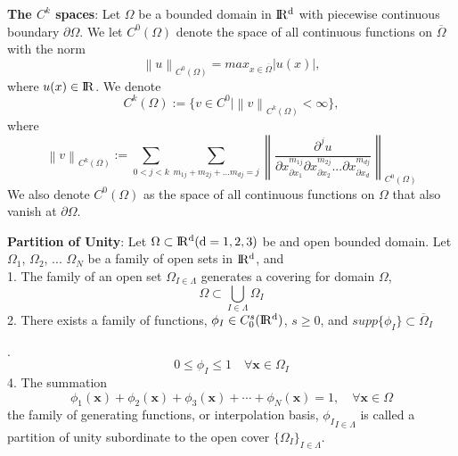 \documentclass[a4paper,12pt,openany]{book}
\newcommand{\R}{\rm I\!R}
\newcommand{\norm}[1]{\left\lVert#1\right\rVert}
\theoremstyle{break}
\begin{document}
\textbf{The $C^k$ spaces}: Let $\Omega$ be a bounded domain in $\R^d$ with piecewise continuous boundary $\partial\Omega$. We let $C^0(\Omega)$ denote the space of all continuous functions on $\overline{\Omega}$ with the norm
\begin{equation}
\norm{u}_{C^0(\Omega)}=max_{x\in\overline{\Omega}}|u(x)|,
\end{equation}
where $u(x)\in\R$. We denote
\begin{equation}
C^k(\Omega):=\{v\in C^0\vert\norm{v}_{C^k (\Omega)}<\infty\},
\end{equation}
where
\begin{equation}
\norm{v}_{C^k (\Omega)}:=\sum_{0<j<k}\sum_{m_{1j}+m_{2j}+...m_{dj}=j}\norm{\frac{\partial^j u}{\partial x^{m_{1j}}_{\partial x_1}\partial x^{m_{2j}}_{\partial x_2}...\partial x^{m_{dj}}_{\partial x_d}}}_{C^0(\Omega)}
\end{equation}
We also denote $C^0(\Omega)$ as the space of all continuous functions on $\Omega$ that also vanish at $\partial\Omega$.

\textbf{Partition of Unity}: Let $\Omega \subset \R^d(d=1,2,3)$ be and open bounded domain. Let $\Omega_1$, $\Omega_2$, ... $\Omega_{N}$ be a family of open sets in $\R^d$, and \\
1. The family of an open set ${\Omega}_{I\in\Lambda}$ generates a covering for domain $\Omega$,
\begin{equation}
\Omega\subset\bigcup\limits_{I\in \Lambda} \Omega_I
\end{equation}
2. There exists a family of functions, $\phi_I\in C_0^s(\R^d)$, $s\geq 0$, and $supp\{\phi_I\}\subset \overline{\Omega}_I$

.
\begin{equation}
0\leq\phi_I\leq 1 \quad \forall \textbf{x} \in \Omega_I
\end{equation}
4. The summation
\begin{equation}
\phi_1(\textbf{x})+\phi_2(\textbf{x})+\phi_3(\textbf{x})+\cdots+\phi_{N}(\textbf{x})=1, \quad \forall \textbf{x}\in\Omega
\end{equation}
the family of generating functions, or interpolation basis, ${\phi_I}_{I\in\Lambda}$ is called a partition of unity subordinate to the open cover $\{\Omega_I\}_{I\in \Lambda}$.
\end{document}
